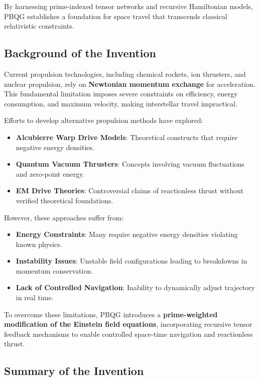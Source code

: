 \documentclass{article}
\theoremstyle{plain}
\begin{document}
By harnessing prime-indexed tensor networks and recursive Hamiltonian models, PBQG establishes a foundation for space travel that transcends classical relativistic constraints.

\subsection{Background of the Invention}
\label{subsec:background}

Current propulsion technologies, including chemical rockets, ion thrusters, and nuclear propulsion, rely on \textbf{Newtonian momentum exchange} for acceleration. This fundamental limitation imposes severe constraints on efficiency, energy consumption, and maximum velocity, making interstellar travel impractical.

Efforts to develop alternative propulsion methods have explored:
\begin{itemize}
    \item \textbf{Alcubierre Warp Drive Models}: Theoretical constructs that require negative energy densities.
    \item \textbf{Quantum Vacuum Thrusters}: Concepts involving vacuum fluctuations and zero-point energy.
    \item \textbf{EM Drive Theories}: Controversial claims of reactionless thrust without verified theoretical foundations.
\end{itemize}

However, these approaches suffer from:
\begin{itemize}
    \item \textbf{Energy Constraints}: Many require negative energy densities violating known physics.
    \item \textbf{Instability Issues}: Unstable field configurations leading to breakdowns in momentum conservation.
    \item \textbf{Lack of Controlled Navigation}: Inability to dynamically adjust trajectory in real time.
\end{itemize}

To overcome these limitations, PBQG introduces a \textbf{prime-weighted modification of the Einstein field equations}, incorporating recursive tensor feedback mechanisms to enable controlled space-time navigation and reactionless thrust.

\subsection{Summary of the Invention}
\label{subsec:summary}
\end{document}
